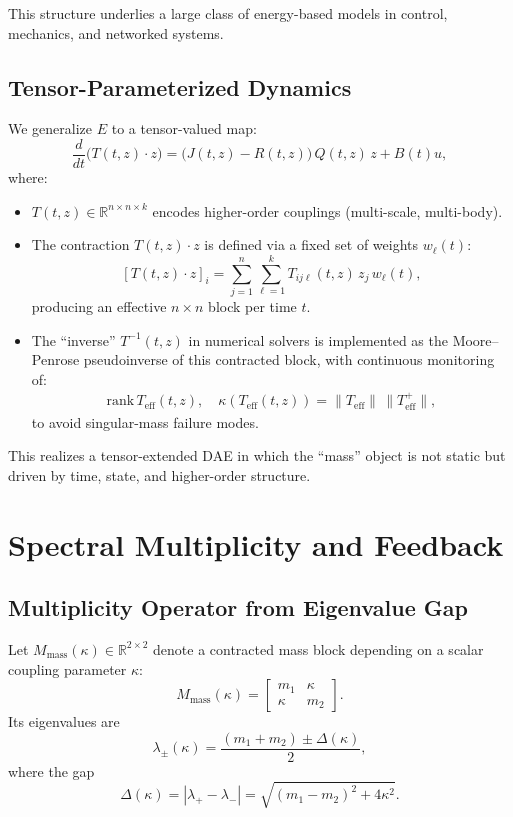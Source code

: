 \documentclass[11pt]{article}
\begin{document}
This structure underlies a large class of energy-based models in control, mechanics, and networked systems.

\subsection{Tensor-Parameterized Dynamics}

We generalize $E$ to a tensor-valued map:
\begin{equation}
  \frac{d}{dt}\big(T(t,z)\cdot z\big)
  = \big(J(t,z) - R(t,z)\big)\,Q(t,z)\,z + B(t)u,
\end{equation}
where:
\begin{itemize}
  \item $T(t,z)\in\mathbb{R}^{n\times n\times k}$ encodes higher-order couplings (multi-scale, multi-body).
  \item The contraction $T(t,z)\cdot z$ is defined via a fixed set of weights $w_\ell(t)$:
  \[
    [T(t,z)\cdot z]_i
    = \sum_{j=1}^n \sum_{\ell=1}^k T_{ij\ell}(t,z)\,z_j\,w_\ell(t),
  \]
  producing an effective $n\times n$ block per time $t$.
  \item The ``inverse'' $T^{-1}(t,z)$ in numerical solvers is implemented as the Moore–Penrose pseudoinverse of this contracted block, with continuous monitoring of:
  \begin{align*}
    \text{rank}\,T_{\text{eff}}(t,z), \quad
    \kappa(T_{\text{eff}}(t,z)) = \|T_{\text{eff}}\|\,\|T_{\text{eff}}^{+}\|,
  \end{align*}
  to avoid singular-mass failure modes.
\end{itemize}

This realizes a tensor-extended DAE in which the ``mass'' object is not static but driven by time, state, and higher-order structure.

\section{Spectral Multiplicity and Feedback}

\subsection{Multiplicity Operator from Eigenvalue Gap}

Let $M_{\text{mass}}(\kappa) \in \mathbb{R}^{2\times 2}$ denote a contracted mass block depending on a scalar coupling parameter $\kappa$:
\begin{equation}
  M_{\text{mass}}(\kappa) =
  \begin{bmatrix}
    m_1 & \kappa\\
    \kappa & m_2
  \end{bmatrix}.
\end{equation}
Its eigenvalues are
\begin{equation}
  \lambda_{\pm}(\kappa) = \frac{(m_1+m_2)\pm \Delta(\kappa)}{2},
\end{equation}
where the gap
\begin{equation}
  \Delta(\kappa) = |\lambda_+ - \lambda_-|
  = \sqrt{(m_1-m_2)^2 + 4\kappa^2}.
\end{equation}
\end{document}
